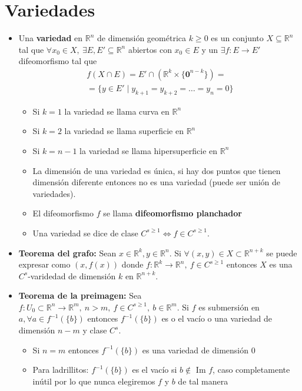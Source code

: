 \documentclass[a4paper,twocolumn]{extarticle}
\newcommand{\R}{\mathbb{R}}
\begin{document}
\section{Variedades}
\begin{itemize}
	\item Una \textbf{variedad} en $\R^n$ de dimensión geométrica $k \geq 0$ es un conjunto $X \subseteq \R^n$ tal que $\forall x_0 \in X,\ \exists E, E' \subseteq \R^n$ abiertos con $x_0 \in E$ y un $\exists f:E \to E'$ difeomorfismo tal que
	\begin{multline*}
		f(X \cap E) = E' \cap (\R^k \times \{\mathbf{0}^{n-k}\}) =\\= \{y \in E' \mid y_{k+1} = y_{k+2} = \dots = y_{n} = 0\}
	\end{multline*}
	\begin{itemize}
		\item Si $k = 1$ la variedad se llama curva en $\R^n$
		\item Si $k = 2$ la variedad se llama superficie en $\R^n$
		\item Si $k = n-1$ la variedad se llama hipersuperficie en $\R^n$
		\item La dimensión de una variedad es única, si hay dos puntos que tienen dimensión diferente entonces no es una variedad (puede ser unión de variedades).
		\item El difeomorfismo $f$ se llama \textbf{difeomorfismo planchador}
		\item Una variedad se dice de clase $C^{s \geq 1} \iff f \in C^{s \geq 1}$.
	\end{itemize}
	\item \textbf{Teorema del grafo:} Sean $x \in \R^k, y \in \R^n$. Si $\forall (x,y) \in X \subset \R^{n+k}$ se puede expresar como $(x, f(x))$ donde $f:\R^k \to \R^n,\ f \in C^{s\geq 1}$ entonces $X$ es una $C^s$-varidedad de dimensión $k$ en $\R^{n+k}$. 
	\item \textbf{Teorema de la preimagen:} Sea $f:U_0 \subset \R^n \to \R^m,\ n > m,\ f\in C^{s \geq 1},\ b \in \R^{m}$. Si $f$ es submersión en $a, \forall a \in f^{-1}(\{b\})$ entonces $f^{-1}(\{b\})$ es o el vacío o una variedad de dimensión $n - m$ y clase $C^s$.
	\begin{itemize}
		\item Si $n = m$ entonces $f^{-1}(\{b\})$ es una variedad de dimensión $0$
		\item Para ladrillitos: $f^{-1}(\{b\})$ es el vacío si $b \notin \text{ Im } f$, caso completamente inútil por lo que nunca elegiremos $f$ y $b$ de tal manera

\end{itemize}
\end{itemize}
\end{document}
